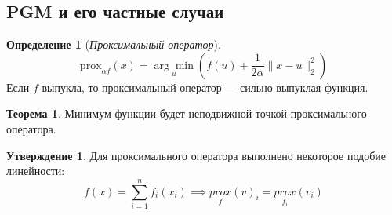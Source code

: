 \documentclass[11pt,a4paper]{report}
\theoremstyle{definition}
\theoremstyle{definition}
\newtheorem{theorem}{Теорема}[section]
\newtheorem{statement}{Утверждение}
\theoremstyle{definition}
\newtheorem*{definition}{Определение}
\begin{document}
	\subsection{PGM и его частные случаи}
	\begin{definition}[\textit{Проксимальный оператор}]
		$$
			\mathrm{prox}_{\alpha f}(x) = \underset{u}{\arg\min} \left (f(u) + \frac{1}{2\alpha}\| x - u \|_2^2\right )
		$$
		Если $ f $ выпукла, то проксимальный оператор — сильно выпуклая функция.
	\end{definition}
	\begin{theorem}
		Минимум функции будет неподвижной точкой проксимального оператора.
	\end{theorem}
	\begin{statement}
		Для проксимального оператора выполнено некоторое подобие линейности:
		$$
			f(x) = \sum\limits_{i=1}^{n} f_{i}(x_i) \implies \underset{f}{prox}(v)_{i} = \underset{f_i}{prox}(v_i) 
		$$
	\end{statement}
\end{document}
